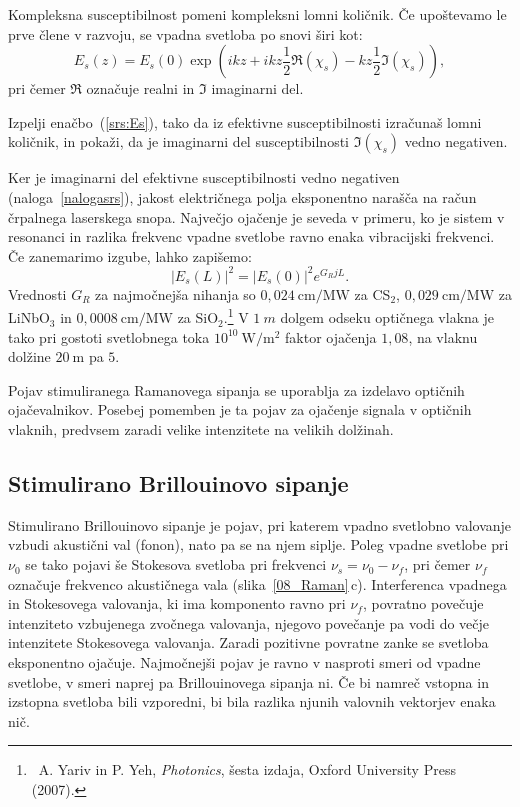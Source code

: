 Kompleksna susceptibilnost pomeni kompleksni lomni količnik. Če upoštevamo
le prve člene v razvoju, se vpadna svetloba po snovi širi 
kot:
\begin{equation}
E_s(z) = E_s(0)\exp\left(i k z + ikz\frac{1}{2}\Re(\chi_s)- k z \frac{1}{2}\Im(\chi_s)\right)\!\!,
\label{srs:Es}
\end{equation}
pri čemer $\Re$ označuje realni in $\Im$ imaginarni del.
\begin{naloga}
\label{nalogasrs}
 Izpelji enačbo~(\ref{srs:Es}), tako da iz efektivne susceptibilnosti izračunaš lomni količnik,
in pokaži, da je imaginarni del susceptibilnosti $\Im(\chi_s)$ vedno negativen. 
\end{naloga}
Ker je imaginarni del efektivne susceptibilnosti vedno negativen (naloga~\ref{nalogasrs}), 
jakost e\-lek\-trič\-nega polja eksponentno narašča na račun črpalnega laserskega snopa. 
Največjo ojačenje je seveda v primeru, ko je sistem v resonanci
in razlika frekvenc vpadne svetlobe ravno enaka vibracijski frekvenci.
Če zanemarimo izgube, lahko zapišemo:
\begin{equation}
|E_s(L)|^2 = |E_s(0)|^2 e^{G_RjL}.
\end{equation}
Vrednosti $G_R$ za najmočnejša nihanja so $0,024~\si{\cm/\mega\watt}$ za CS$_2$, 
$0,029~\si{\cm/\mega\watt}$ za LiNbO$_3$ 
in $0,0008~\si{\cm/\mega\watt}$ za SiO$_2$.\footnote{~A. Yariv in 
P. Yeh, {\it Photonics}, šesta izdaja, Oxford University Press (2007).}
V $1~\si{m}$ dolgem odseku optičnega vlakna je tako pri gostoti svetlobnega toka 
$10^{10}~\si{\watt/\meter^2}$ faktor ojačenja $1,08$, na vlaknu dolžine $20~\si{\metre}$
pa $5$.

\begin{remark}
Pojav stimuliranega Ramanovega sipanja se uporablja za izdelavo optičnih 
ojačevalnikov. Posebej pomemben je ta pojav za ojačenje signala v 
optičnih vlaknih, predvsem zaradi velike intenzitete na velikih dolžinah.
\end{remark}

\subsection*{Stimulirano Brillouinovo sipanje}
Stimulirano Brillouinovo sipanje je pojav, pri katerem vpadno svetlobno valovanje
vzbudi akustični val (fonon), nato pa se na njem siplje. Poleg vpadne svetlobe pri $\nu_0$
se tako pojavi še Stokesova svetloba pri frekvenci $\nu_s = \nu_0-\nu_f$, pri čemer 
$\nu_f$ označuje frekvenco akustičnega vala  (slika~\ref{08_Raman}\,c). Interferenca
vpadnega in Stokesovega valovanja, ki ima komponento ravno pri $\nu_f$, povratno
povečuje intenziteto vzbujenega zvočnega valovanja, njegovo povečanje pa vodi do
večje intenzitete Stokesovega valovanja. Zaradi pozitivne povratne zanke se 
svetloba eksponentno ojačuje. Najmočnejši pojav je 
ravno v nasproti smeri od vpadne svetlobe, v smeri naprej pa Brillouinovega sipanja ni.
Če bi namreč vstopna in izstopna svetloba bili vzporedni, bi bila razlika njunih
valovnih vektorjev enaka nič. 

